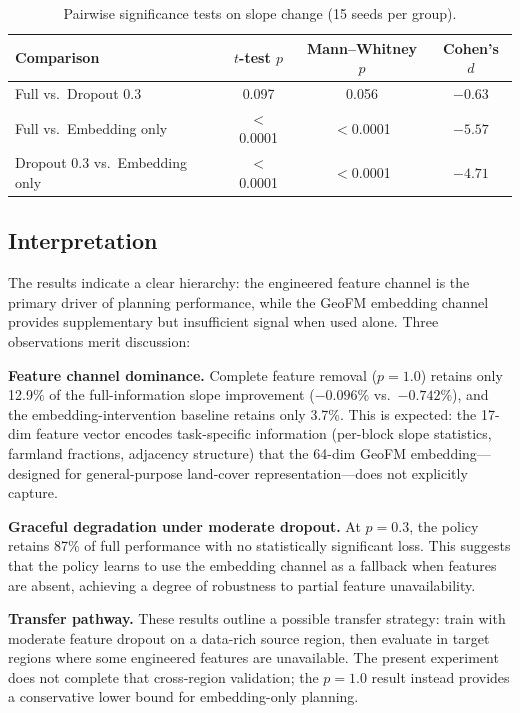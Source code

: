\documentclass{article}
\begin{document}
\begin{table}[htbp]
\centering
\caption{Pairwise significance tests on slope change (15 seeds per group).}
\label{tab:significance}
\begin{tabular}{lccc}
\toprule
Comparison & $t$-test $p$ & Mann--Whitney $p$ & Cohen's $d$ \\
\midrule
Full vs.\ Dropout 0.3 & 0.097 & 0.056 & $-0.63$ \\
Full vs.\ Embedding only & $<$0.0001 & $<$0.0001 & $-5.57$ \\
Dropout 0.3 vs.\ Embedding only & $<$0.0001 & $<$0.0001 & $-4.71$ \\
\bottomrule
\end{tabular}
\end{table}

\subsection{Interpretation}

The results indicate a clear hierarchy: the engineered feature channel is the primary driver of planning performance, while the GeoFM embedding channel provides supplementary but insufficient signal when used alone. Three observations merit discussion:

\textbf{Feature channel dominance.} Complete feature removal ($p=1.0$) retains only 12.9\% of the full-information slope improvement ($-0.096\%$ vs.\ $-0.742\%$), and the embedding-intervention baseline retains only 3.7\%. This is expected: the 17-dim feature vector encodes task-specific information (per-block slope statistics, farmland fractions, adjacency structure) that the 64-dim GeoFM embedding---designed for general-purpose land-cover representation---does not explicitly capture.

\textbf{Graceful degradation under moderate dropout.} At $p=0.3$, the policy retains 87\% of full performance with no statistically significant loss. This suggests that the policy learns to use the embedding channel as a fallback when features are absent, achieving a degree of robustness to partial feature unavailability.

\textbf{Transfer pathway.} These results outline a possible transfer strategy: train with moderate feature dropout on a data-rich source region, then evaluate in target regions where some engineered features are unavailable. The present experiment does not complete that cross-region validation; the $p=1.0$ result instead provides a conservative lower bound for embedding-only planning.
\end{document}
